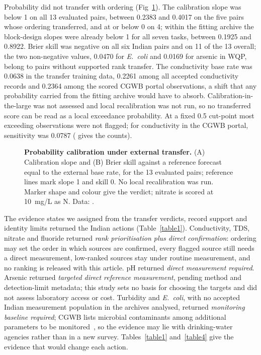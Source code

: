 \documentclass[10pt,letterpaper]{article}
\begin{document}
Probability did not transfer with ordering (Fig~\ref{fig:transfer-calibration}). The calibration slope was below 1 on all 13 evaluated pairs, between 0.2383 and 0.4017 on the five pairs whose ordering transferred, and at or below 0 on 4; within the fitting archive the block-design slopes were already below 1 for all seven tasks, between 0.1925 and 0.8922. Brier skill was negative on all six Indian pairs and on 11 of the 13 overall; the two non-negative values, 0.0470 for \textit{E.~coli} and 0.0169 for arsenic in WQP, belong to pairs without supported rank transfer. The conductivity base rate was 0.0638 in the transfer training data, 0.2261 among all accepted conductivity records and 0.2364 among the scored CGWB portal observations, a shift that any probability carried from the fitting archive would have to absorb. Calibration-in-the-large was not assessed and local recalibration was not run, so no transferred score can be read as a local exceedance probability. At a fixed 0.5 cut-point most exceeding observations were not flagged; for conductivity in the CGWB portal, sensitivity was 0.0787 ( gives the counts).\label{callout:fig:transfer-calibration}

\begin{figure}[!ht]
\caption{\textbf{Probability calibration under external transfer.} (A) Calibration slope and (B) Brier skill against a reference forecast equal to the external base rate, for the 13 evaluated pairs; reference lines mark slope 1 and skill 0. No local recalibration was run. Marker shape and colour give the verdict; nitrate is scored at 10~mg/L as N. Data: .}
\label{fig:transfer-calibration}
\end{figure}

The evidence states we assigned from the transfer verdicts, record support and identity limits returned the Indian actions (Table~\ref{table1}). Conductivity, TDS, nitrate and fluoride returned \textit{rank prioritisation plus direct confirmation}: ordering may set the order in which sources are confirmed, every flagged source still needs a direct measurement, low-ranked sources stay under routine measurement, and no ranking is released with this article. pH returned \textit{direct measurement required}. Arsenic returned \textit{targeted direct reference measurement}, pending method and detection-limit metadata; this study sets no basis for choosing the targets and did not assess laboratory access or cost. Turbidity and \textit{E.~coli}, with no accepted Indian measurement population in the archives analysed, returned \textit{monitoring baseline required}; CGWB lists microbial contaminants among additional parameters to be monitored~\cite{CGWB-SOP-GWQDataAnalysis}, so the evidence may lie with drinking-water agencies rather than in a new survey. Tables~\ref{table1} and~\ref{table4} give the evidence that would change each action.
\end{document}
